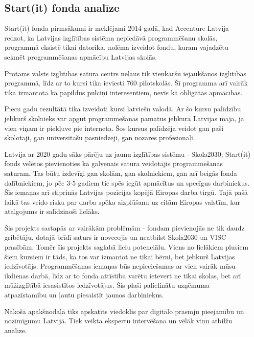 \subsection{Start(it) fonda analīze}
Start(it) fonda pirmsākumi ir meklējami 2014 gadā, kad Accenture Latvija redzot, ka Latvijas izglītības
sistēma nepiedāvā programmēšanu skolās, programmā eksistē tikai datorika, nolēma izveidot fondu, kuram
vajadzētu sekmēt programmēšanas apmācību Latvijas skolās.
\par
Protams valsts izglītības satura centrs neļaus tik vienkāršu iejaukšanos izglītības programmā, līdz ar
to kursi tika ieviesti 760 pilotskolās. Šī programma arī vairāk tika izmantota kā papildus pulciņi 
interesentiem, nevis kā obligātās apmācības.
\par
Piecu gadu rezultātā tika izveidoti kursi latviešu valodā. Ar šo kursu palīdzību jebkurš skolnieks 
var apgūt programmēšanas pamatus jebkurā Latvijas mājā, ja vien viņam ir piekļuve pie interneta. Šos kursus palīdzēja
veidot gan paši skolotāji, gan universitāšu pasniedzēji, gan nozares profesionāļi.
\par
Latvija ar 2020 gadu sāks pārēju uz jaunu izglītības sistēmu - Skola2030; Start(it) fonds vēlētos pievienoties
kā galvenais satura veidotājis programmēšanas saturam. Tas būtu izdevīgi gan skolām, gan skolniekiem,
gan arī beigās fonda dalībniekiem, jo pēc 3-5 gadiem tie spēs iegūt apmācītus un specīgus darbiniekus.
Šīs iemaņas arī stiprinās Latvijas pozīcijas kopējā Eiropas darba tirgū. Tajā pašā laikā tas veido risku
par darba spēka aizplūšanu uz citām Eiropas valstīm, kur atalgojums ir salīdzinoši lielāks.
\par
Šis projekts sastapās ar vairākām problēmām - fondam pievienojās ne tik daudz gribētāju, dotajā brīdī
saturs ir novecojis un neatbilst Skola2030 un VISC prasībām. Tomēr šis projekts saglabā lielu potenciālu.
Viens no lielākiem plusiem šiem kursiem ir tāds, ka tos var izmantot ne tikai bērni, bet jebkurš Latvijas
iedzīvotājs. Programmēšanas iemaņas būs nepieciešamas ar vien vairāk mūsu ikdienas darbā, līdz ar to fonda
attīstība varētu ietevert ne tikai skolas, bet arī mūžizglītībā iesasistītos iedzīvotājus. Šis plaši palielinātu
uzņēmuma atpazīstamību un ļautu piesaistīt jaunos darbiniekus.
\par
Nākošā apakšnodaļā tiks apskatīts viedoklis par digitālo prasmju pieejamību un nozīmīgumu Latvijā. Tiek veikta
ekspertu intervēšana un vēlāk viņu atbilžu analīze.

